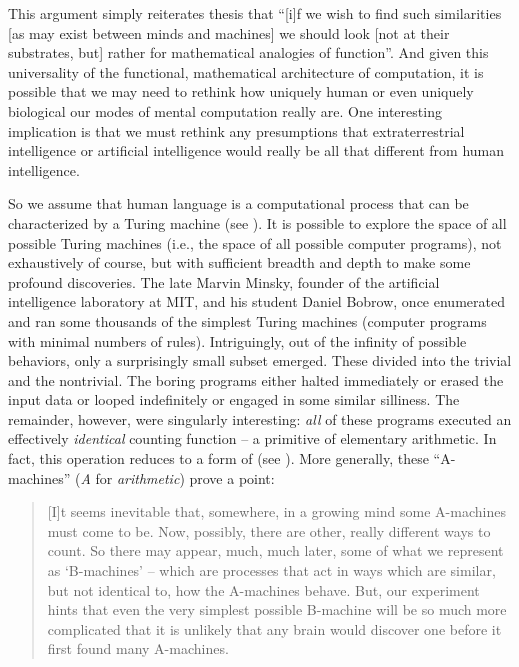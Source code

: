 \documentclass[output=paper]{langsci/langscibook}
\begin{document}
This argument simply reiterates  thesis that 
“[i]f we wish to find such similarities [as
may exist between minds and machines] we should look [not at their substrates,
but] rather for mathematical analogies of function”.  And given this
universality of the functional, mathematical architecture of computation, it is
possible that we may need to rethink how uniquely human or even uniquely
biological our modes of mental computation really are. One interesting
implication is that we must rethink any presumptions that extraterrestrial
intelligence or artificial intelligence would really be all that different from
human intelligence.

So we assume that human language is a computational process that can be
characterized by a Turing machine (see \citealt{Watumull2015}). It is possible
to explore the space of all possible Turing machines (i.e., the space of all
possible computer programs), not exhaustively of course, but with sufficient
breadth and depth to make some profound discoveries. The late Marvin Minsky,
founder of the artificial intelligence laboratory at MIT, and his student
{Daniel Bobrow, once enumerated and ran some thousands of the
simplest Turing machines (computer programs with minimal numbers of rules).}{}
{Intriguingly, out of the infinity of possible behaviors, only a
surprisingly small subset emerged.} {These divided into the
trivial and the nontrivial.} {The boring programs either halted
immediately or erased the input data or looped indefinitely or engaged in some
similar silliness.} {The remainder, however, were singularly
interesting: \emph{all} of these programs executed an effectively
\emph{identical} counting function -- a primitive of elementary
arithmetic.} {In fact, this operation reduces to a form of 
(see \citealt{Chomsky2008}).} {More generally, these “A-machines”
(\emph{A} for \emph{arithmetic}) prove a point:}

\begin{quote}
    [I]t seems inevitable that, somewhere, in a growing mind some A-machines
    must come to be. Now, possibly, there are other, really different ways to
    count. So there may appear, much, much later, some of what we represent as
    ‘B-machines’ – which are processes that act in ways which are similar, but
    not identical to, how the A-machines behave. But, our experiment hints that
    even the very simplest possible B-machine will be so much more complicated
    that it is unlikely that any brain would discover one before it first found
    many A-machines.\hfill\hbox{\parencite[121]{Minsky1985}}
\end{quote}
\end{document}
